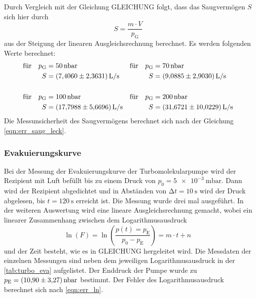     \noindent Durch Vergleich mit der Gleichung GLEICHUNG folgt, dass das Saugvermögen $S$ sich hier durch
    \begin{equation*}
      S = \frac{m \cdot V}{p_\text{G}}
    \end{equation*}
    aus der Steigung der linearen Ausgleichsrechnung berechnet. Es werden folgenden Werte berechnet:
    \begin{align*}
      \text{für} \quad p_\text{G} &= \SI{50}{\nano\bar} & \text{für} \quad p_\text{G} &= \SI{70}{\nano\bar} \\
      S &= \SI{7.4060 \pm 2.3631}{L\per\second}  & S &= \SI{9.0885 \pm 2.903}{L\per\second}  \\
      \\
      \text{für} \quad p_\text{G} &= \SI{100}{\nano\bar} & \text{für} \quad p_\text{G} &= \SI{200}{\nano\bar} \\
      S &= \SI{17.7988 \pm 5.6696}{L\per\second}  & S &= \SI{31.6721 \pm 10.0229}{L\per\second}  
    \end{align*}
    Die Messunsicherheit des Saugvermögens berechnet sich nach der Gleichung \eqref{eqn:err_saug_leck}.

  \subsubsection{Evakuierungskurve}

    \noindent Bei der Messung der Evakuierungskurve der Turbomolekularpumpe wird der Rezipient mit Luft befüllt bis zu einem Druck von $p_0 = \SI{5e-3}{\milli\bar}$. Dann wird der Rezipient 
    abgedichtet und in Abständen von $\increment t = \SI{10}{\second}$ wird der Druck abgelesen, bis $ t = \SI{120}{\second}$ erreicht ist. Die Messung wurde drei mal ausgeführt.
    In der weiteren Auswertung wird eine lineare Ausgleichsrechnung gemacht, wobei ein linearer Zusammenhang zwischen dem Logarithmusausdruck 
    \begin{equation*}
      \ln(F) = \ln \left( \frac{p(t) = p_\text{E}}{p_0 - p_\text{E}}\right) = m \cdot t + n \, 
    \end{equation*} 
    und der Zeit besteht, wie es in GLEICHUNG hergeleitet wird. Die Messdaten der einzelnen Messungen sind neben dem jeweiligen Logarithmusausdruck in der \autoref{tab:turbo_eva} aufgelistet. 
    Der Enddruck der Pumpe wurde zu $p_\text{E} = \SI{10.9 \pm 3.27}{\nano\bar}$ bestimmt. Der Fehler des Logarithmusausdruck berechnet sich nach \eqref{eqn:err_ln}.
  


